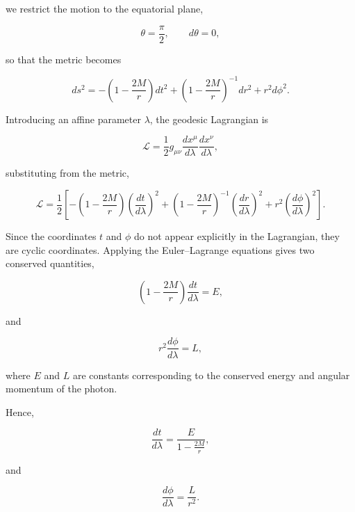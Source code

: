 \documentclass[12pt]{article}
\begin{document}
\begin{itemize}
we restrict the motion to the equatorial plane,

\begin{equation}
\theta=\frac{\pi}{2},
\qquad
d\theta=0,
\end{equation}

so that the metric becomes

\begin{equation}
ds^2=
-\left(1-\frac{2M}{r}\right)dt^2
+\left(1-\frac{2M}{r}\right)^{-1}dr^2
+r^2d\phi^2.
\end{equation}

Introducing an affine parameter $\lambda$, the geodesic Lagrangian is

\begin{equation}
\mathcal{L}
=
\frac12
g_{\mu\nu}
\frac{dx^\mu}{d\lambda}
\frac{dx^\nu}{d\lambda},
\end{equation}

substituting from the metric,

\begin{equation}
\mathcal{L}
=
\frac12
\left[
-\left(1-\frac{2M}{r}\right)
\left(\frac{dt}{d\lambda}\right)^2
+
\left(1-\frac{2M}{r}\right)^{-1}
\left(\frac{dr}{d\lambda}\right)^2
+
r^2
\left(\frac{d\phi}{d\lambda}\right)^2
\right].
\end{equation}

Since the coordinates $t$ and $\phi$ do not appear explicitly in the Lagrangian, they are cyclic coordinates. Applying the Euler--Lagrange equations gives two conserved quantities,

\begin{equation}
\left(1-\frac{2M}{r}\right)
\frac{dt}{d\lambda}
=
E,
\end{equation}

and

\begin{equation}
r^2
\frac{d\phi}{d\lambda}
=
L,
\end{equation}

where $E$ and $L$ are constants corresponding to the conserved energy and angular momentum of the photon.

Hence,

\begin{equation}
\frac{dt}{d\lambda}
=
\frac{E}{1-\frac{2M}{r}},
\end{equation}

and

\begin{equation}
\frac{d\phi}{d\lambda}
=
\frac{L}{r^2}.
\end{equation}


\end{itemize}
\end{document}
